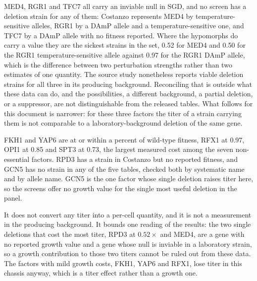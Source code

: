 \begin{table}[h]
\centering\footnotesize

\caption{Single-mutant fitness of the ten deleted transcription factors in the growth
screens, relative to wild type. A dash is a gene the screen carries no fitness value for,
either because it has no strain there or because the released table leaves the value
empty. ``inviable'' marks a gene whose null allele SGD records as inviable, which is why
the screens carry a temperature-sensitive or DAmP allele for it rather than a deletion.}
\end{table}

 MED4, RGR1 and
TFC7 all carry an inviable null in SGD, and no screen has a deletion strain for any of
them: Costanzo represents MED4 by temperature-sensitive alleles, RGR1 by a DAmP allele and
a temperature-sensitive one, and TFC7 by a DAmP allele with no fitness reported. Where the
hypomorphs do carry a value they are the sickest strains in the set, 0.52 for MED4 and
0.50 for the RGR1 temperature-sensitive allele against 0.97 for the RGR1 DAmP allele,
which is the difference between two perturbation strengths rather than two estimates of
one quantity. The source study nonetheless reports viable deletion strains for all three
in its producing background. Reconciling that is outside what these data can do, and the
possibilities, a different background, a partial deletion, or a suppressor, are not
distinguishable from the released tables. What follows for this document is narrower: for
these three factors the titer of a strain carrying them is not comparable to a
laboratory-background deletion of the same gene.

 FKH1 and YAP6 are at or within a percent of
wild-type fitness, RFX1 at 0.97, OPI1 at 0.85 and SPT3 at 0.73, the largest measured cost
among the seven non-essential factors. RPD3 has a strain in Costanzo but no reported
fitness, and GCN5 has no strain in any of the five tables, checked both by systematic name
and by allele name. GCN5 is the one factor whose single deletion raises titer here, so the
screens offer no growth value for the single most useful deletion in the panel.

 It does not convert any titer into a
per-cell quantity, and it is not a measurement in the producing background. It bounds one
reading of the results: the two single deletions that cost the most titer, RPD3 at
$0.52\times$ and MED4, are a gene with no reported growth value and a gene whose null is
inviable in a laboratory strain, so a growth contribution to those two titers cannot be
ruled out from these data. The factors with mild growth costs, FKH1, YAP6 and RFX1, lose
titer in this chassis anyway, which is a titer effect rather than a growth one.

